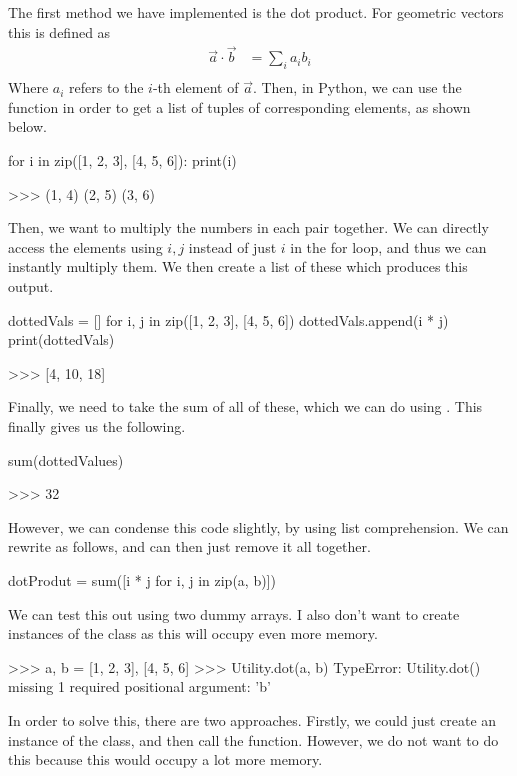 \vs
The first method we have implemented is the dot product. For geometric vectors this is defined as 
\begin{align*}
    \vec{a} \cdot \vec{b} &= \sum_i a_i b_i\\
\end{align*}
Where $a_i$ refers to the $i$-th element of $\vec{a}$. Then, in Python, we can use the  function in order to get a list of tuples of corresponding elements, as shown below.
\begin{mpy}
for i in zip([1, 2, 3], [4, 5, 6]):
    print(i)

>>> (1, 4)
    (2, 5)
    (3, 6)
\end{mpy}

\vs
Then, we want to multiply the numbers in each pair together. We can directly access the elements using $i, j$ instead of just $i$ in the for loop, and thus we can instantly multiply them. We then create a list of these which produces this output.

\begin{mpy}
dottedVals = []
for i, j in zip([1, 2, 3], [4, 5, 6])
    dottedVals.append(i * j)
print(dottedVals)

>>> [4, 10, 18]
\end{mpy}

\vs
Finally, we need to take the sum of all of these, which we can do using . This finally gives us the following.

\begin{mpy}
sum(dottedValues)

>>> 32
\end{mpy}
However, we can condense this code slightly, by using list comprehension. We can rewrite  as follows, and can then just remove it all together.

\vs
\begin{mpy}
dotProdut = sum([i * j for i, j in zip(a, b)])
\end{mpy}

\vs
We can test this out using two dummy arrays. I also don't want to create instances of the  class as this will occupy even more memory.

\begin{mpy}
>>> a, b = [1, 2, 3], [4, 5, 6]
>>> Utility.dot(a, b)
TypeError: Utility.dot() missing 1 required positional argument: 'b'
\end{mpy}
\vs

In order to solve this, there are two approaches. Firstly, we could just create an instance of the  class, and then call the function. However, we do not want to do this because this would occupy a lot more memory.

